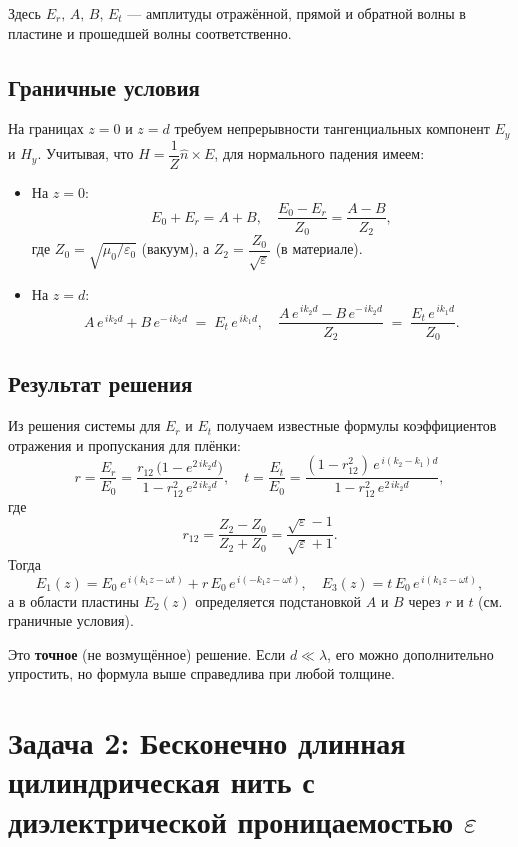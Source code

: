 \documentclass{article}
\begin{document}
Здесь $E_r,\,A,\,B,\,E_t$ --- амплитуды отражённой, прямой и обратной волны в пластине и прошедшей волны соответственно.

\subsection*{Граничные условия}

На границах $z=0$ и $z=d$ требуем непрерывности тангенциальных компонент $E_y$ и $H_y$.
Учитывая, что $H = \dfrac{1}{Z} \hat{n} \times E$,
для нормального падения имеем:

\begin{itemize}
  \item На $z=0$:
    \[
    E_0 + E_r = A + B,
    \quad
    \dfrac{E_0 - E_r}{Z_0} = \dfrac{A - B}{Z_2},
    \]
    где $Z_0 = \sqrt{\mu_0/\varepsilon_0}$ (вакуум), а $Z_2 = \dfrac{Z_0}{\sqrt{\varepsilon}}$ (в материале).

  \item На $z=d$:
    \[
    A\,e^{\,i k_2 d} + B\,e^{-\,i k_2 d} \;=\; E_t\,e^{\,i k_1 d},
    \quad
    \dfrac{A\,e^{\,i k_2 d} - B\,e^{-\,i k_2 d}}{Z_2}
    \;=\; \dfrac{E_t\,e^{\,i k_1 d}}{Z_0}.
    \]
\end{itemize}

\subsection*{Результат решения}
Из решения системы для $E_r$ и $E_t$ получаем известные формулы коэффициентов отражения и пропускания для плёнки:
\[
r = \frac{E_r}{E_0}
=
\frac{
r_{12}\,\bigl(1 - e^{2\,i k_2 d}\bigr)
}{
1 - r_{12}^2\,e^{2\,i k_2 d}
},
\quad
t = \frac{E_t}{E_0}
=
\frac{
(1 - r_{12}^2)\,e^{\,i(k_2 - k_1)d}
}{
1 - r_{12}^2\,e^{2\,i k_2 d}
},
\]
где
\[
r_{12} = \frac{Z_2 - Z_0}{Z_2 + Z_0} = \frac{\sqrt{\varepsilon} - 1}{\sqrt{\varepsilon} + 1}.
\]
Тогда
\[
E_1(z) = E_0\,e^{\,i(k_1 z - \omega t)} + r\,E_0\,e^{\,i(-k_1 z - \omega t)},
\quad
E_3(z) = t\,E_0\,e^{\,i(k_1 z - \omega t)},
\]
а в области пластины $E_2(z)$ определяется подстановкой $A$ и $B$ через $r$ и $t$ (см. граничные условия).

Это \textbf{точное} (не возмущённое) решение.
Если $d \ll \lambda$, его можно дополнительно упростить, но формула выше справедлива при любой толщине.

\newpage

\section*{Задача 2: Бесконечно длинная цилиндрическая нить с диэлектрической проницаемостью \(\varepsilon\)}
\end{document}
